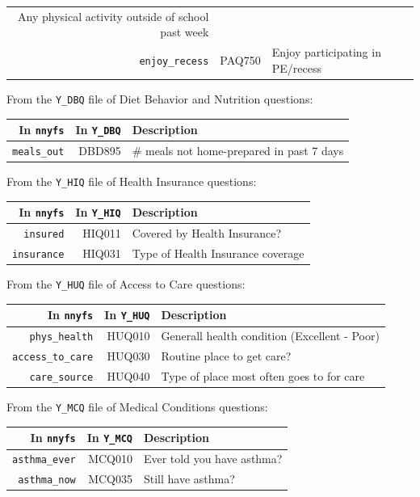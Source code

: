 \documentclass[
]{book}
\begin{document}
\begin{longtable}[]{@{}rrl@{}}
\begin{minipage}[t]{0.55\columnwidth}
Any physical activity outside of school past week\strut
\end{minipage}\tabularnewline
\begin{minipage}[t]{0.20\columnwidth}\raggedleft
\texttt{enjoy\_recess}\strut
\end{minipage} & \begin{minipage}[t]{0.16\columnwidth}\raggedleft
PAQ750\strut
\end{minipage} & \begin{minipage}[t]{0.55\columnwidth}\raggedright
Enjoy participating in PE/recess\strut
\end{minipage}\tabularnewline
\bottomrule
\end{longtable}

From the \texttt{Y\_DBQ} file of Diet Behavior and Nutrition questions:

\begin{longtable}[]{@{}rrl@{}}
\toprule
In \texttt{nnyfs} & In \texttt{Y\_DBQ} & Description\tabularnewline
\midrule
\endhead
\texttt{meals\_out} & DBD895 & \# meals not home-prepared in past 7 days\tabularnewline
\bottomrule
\end{longtable}

From the \texttt{Y\_HIQ} file of Health Insurance questions:

\begin{longtable}[]{@{}rrl@{}}
\toprule
In \texttt{nnyfs} & In \texttt{Y\_HIQ} & Description\tabularnewline
\midrule
\endhead
\texttt{insured} & HIQ011 & Covered by Health Insurance?\tabularnewline
\texttt{insurance} & HIQ031 & Type of Health Insurance coverage\tabularnewline
\bottomrule
\end{longtable}

From the \texttt{Y\_HUQ} file of Access to Care questions:

\begin{longtable}[]{@{}rrl@{}}
\toprule
In \texttt{nnyfs} & In \texttt{Y\_HUQ} & Description\tabularnewline
\midrule
\endhead
\texttt{phys\_health} & HUQ010 & Generall health condition (Excellent - Poor)\tabularnewline
\texttt{access\_to\_care} & HUQ030 & Routine place to get care?\tabularnewline
\texttt{care\_source} & HUQ040 & Type of place most often goes to for care\tabularnewline
\bottomrule
\end{longtable}

From the \texttt{Y\_MCQ} file of Medical Conditions questions:

\begin{longtable}[]{@{}rrl@{}}
\toprule
In \texttt{nnyfs} & In \texttt{Y\_MCQ} & Description\tabularnewline
\midrule
\endhead
\texttt{asthma\_ever} & MCQ010 & Ever told you have asthma?\tabularnewline
\texttt{asthma\_now} & MCQ035 & Still have asthma?\tabularnewline
\bottomrule
\end{longtable}
\end{document}
